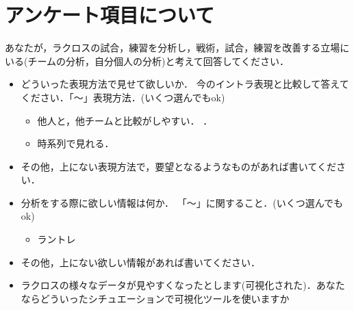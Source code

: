 \documentclass[shuuron]{kuee}
\begin{document}





\appendix
\chapter{アンケート項目について}
	あなたが，ラクロスの試合，練習を分析し，戦術，試合，練習を改善する立場にいる(チームの分析，自分個人の分析)と考えて回答してください．
	\begin{itemize}
		\item どういった表現方法で見せて欲しいか．
			今のイントラ表現と比較して答えてください．「〜」表現方法．(いくつ選んでもok)
			\begin{itemize}
				\item 他人と，他チームと比較がしやすい．
．
				\item 時系列で見れる．
			\end{itemize}
		\item その他，上にない表現方法で，要望となるようなものがあれば書いてください．
		\item 分析をする際に欲しい情報は何か．
			「〜」に関すること．(いくつ選んでもok)
			\begin{itemize}
				\item ラントレ

			\end{itemize}
		\item その他，上にない欲しい情報があれば書いてください．
		\item ラクロスの様々なデータが見やすくなったとします(可視化された)．あなたならどういったシチュエーションで可視化ツールを使いますか
	\end{itemize}
\end{document}
